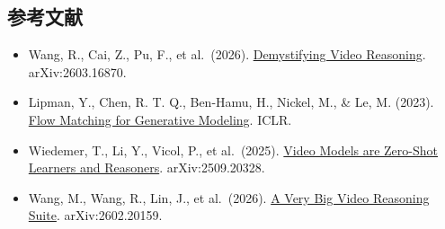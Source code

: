 \FloatBarrier
{}
\hypertarget{ux53c2ux8003ux6587ux732e-145}{%
\subsection{参考文献}\label{ux53c2ux8003ux6587ux732e-145}}

\vspace{0.25em}
\begin{itemize}
\tightlist
\item
  Wang, R., Cai, Z., Pu, F., et al.~(2026). \href{https://arxiv.org/abs/2603.16870}{Demystifying Video Reasoning}. arXiv:2603.16870.
\item
  Lipman, Y., Chen, R. T. Q., Ben-Hamu, H., Nickel, M., \& Le, M. (2023). \href{https://arxiv.org/abs/2210.02747}{Flow Matching for Generative Modeling}. ICLR.
\item
  Wiedemer, T., Li, Y., Vicol, P., et al.~(2025). \href{https://arxiv.org/abs/2509.20328}{Video Models are Zero-Shot Learners and Reasoners}. arXiv:2509.20328.
\item
  Wang, M., Wang, R., Lin, J., et al.~(2026). \href{https://arxiv.org/abs/2602.20159}{A Very Big Video Reasoning Suite}. arXiv:2602.20159.
\end{itemize}

\clearpage
